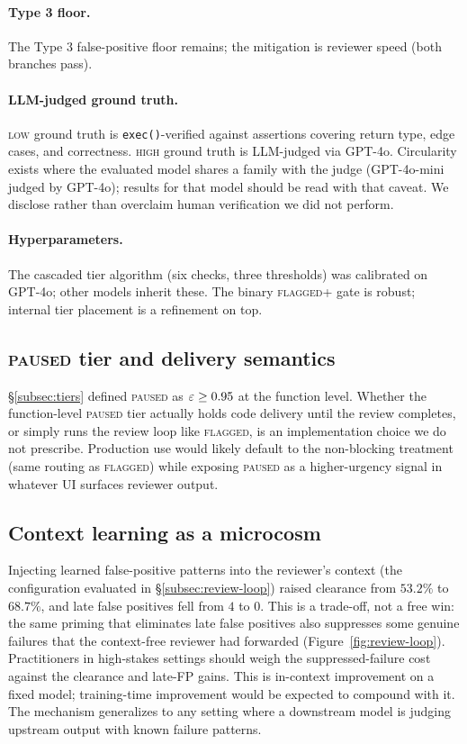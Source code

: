 \paragraph{Type 3 floor.} The Type 3 false-positive floor remains;
the mitigation is reviewer speed (both branches pass).

\paragraph{LLM-judged ground truth.}\label{subsec:gt-disclosure}
\textsc{low} ground truth is \texttt{exec()}-verified against
assertions covering return type, edge cases, and correctness.
\textsc{high} ground truth is LLM-judged via GPT-4o. Circularity
exists where the evaluated model shares a family with the judge
(GPT-4o-mini judged by GPT-4o); results for that model should be
read with that caveat. We disclose rather than overclaim human
verification we did not perform.

\paragraph{Hyperparameters.} The cascaded tier algorithm (six
checks, three thresholds) was calibrated on GPT-4o; other models
inherit these. The binary \textsc{flagged+} gate is robust;
internal tier placement is a refinement on top.

\subsection{\textsc{paused} tier and delivery semantics}
\label{subsec:paused}

\S\ref{subsec:tiers} defined \textsc{paused} as $\varepsilon \ge 0.95$
at the function level. Whether the function-level \textsc{paused}
tier actually holds code delivery until the review completes, or
simply runs the review loop like \textsc{flagged}, is an
implementation choice we do not prescribe. Production use would
likely default to the non-blocking treatment (same routing as
\textsc{flagged}) while exposing \textsc{paused} as a higher-urgency
signal in whatever UI surfaces reviewer output.

\subsection{Context learning as a microcosm}
\label{subsec:context}

Injecting learned false-positive patterns into the reviewer's
context (the configuration evaluated in \S\ref{subsec:review-loop})
raised clearance from $53.2\%$ to $68.7\%$, and late false positives
fell from $4$ to $0$. This is a trade-off, not a free win: the same
priming that eliminates late false positives also suppresses some
genuine failures that the context-free reviewer had forwarded
(Figure~\ref{fig:review-loop}). Practitioners in high-stakes
settings should weigh the suppressed-failure cost against the
clearance and late-FP gains. This is in-context improvement on a
fixed model; training-time improvement would be expected to compound
with it. The mechanism generalizes to any setting where a downstream
model is judging upstream output with known failure patterns.

